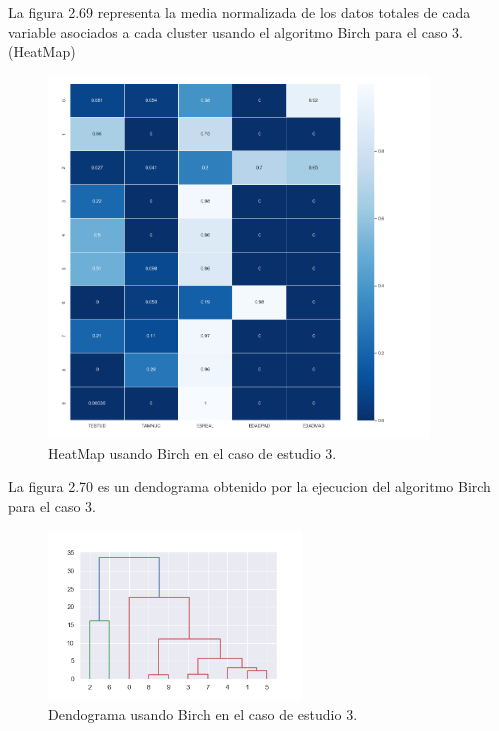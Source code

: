 	La figura 2.69 representa la media normalizada de los datos totales de cada variable asociados
	a cada cluster usando el algoritmo Birch para el caso 3.(HeatMap) \\

	\begin{figure}[htb]
		\centering
		\includegraphics[width=0.9\textwidth]{./imagenes/caso3/heatmap_caso3_Birch}
		\caption{HeatMap usando Birch en el caso de estudio 3.} \label{fig:1}
	\end{figure}


	La figura 2.70 es un dendograma obtenido por la ejecucion del algoritmo Birch para
	el caso 3. \\

	\begin{figure}[htb]
		\centering
		\includegraphics[width=0.6\textwidth]{./imagenes/caso3/dendograma_caso3_Birch}
		\caption{Dendograma usando Birch en el caso de estudio 3.} \label{fig:1}
	\end{figure}

